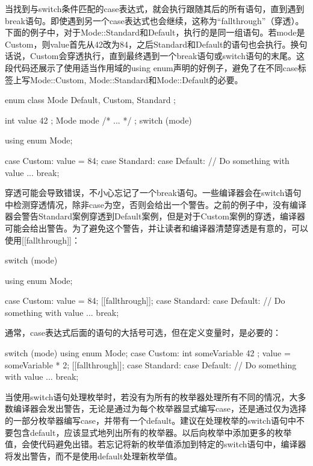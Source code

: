 当找到与switch条件匹配的case表达式，就会执行跟随其后的所有语句，直到遇到break语句。即使遇到另一个case表达式也会继续，这称为“fallthrough”（穿透）。下面的例子中，对于Mode::Standard和Default，执行的是同一组语句。若mode是Custom，则value首先从42改为84，之后Standard和Default的语句也会执行。换句话说，Custom会穿透执行，直到最终遇到一个break语句或switch语句的末尾。这段代码还展示了使用适当作用域的using enum声明的好例子，避免了在不同case标签上写Mode::Custom, Mode::Standard和Mode::Default的必要。

\begin{cpp}
enum class Mode { Default, Custom, Standard };

int value { 42 };
Mode mode { /* ... */ };
switch (mode) {
    using enum Mode;

    case Custom:
        value = 84;
    case Standard:
    case Default:
        // Do something with value ...
        break;
}
\end{cpp}

穿透可能会导致错误，不小心忘记了一个break语句。一些编译器会在switch语句中检测穿透情况，除非case为空，否则会给出一个警告。之前的例子中，没有编译器会警告Standard案例穿透到Default案例，但是对于Custom案例的穿透，编译器可能会给出警告。为了避免这个警告，并让读者和编译器清楚穿透是有意的，可以使用[[fallthrough]]：

\begin{cpp}
switch (mode) {
    using enum Mode;

    case Custom:
        value = 84;
        [[fallthrough]];
    case Standard:
    case Default:
        // Do something with value ...
        break;
}
\end{cpp}

通常，case表达式后面的语句的大括号可选，但在定义变量时，是必要的：

\begin{cpp}
switch (mode) {
    using enum Mode;
    case Custom:
        {
            int someVariable { 42 };
            value = someVariable * 2;
            [[fallthrough]];
        }
    case Standard:
    case Default:
        // Do something with value ...
        break;
}
\end{cpp}

当使用switch语句处理枚举时，若没有为所有的枚举器处理所有不同的情况，大多数编译器会发出警告，无论是通过为每个枚举器显式编写case，还是通过仅为选择的一部分枚举器编写case，并带有一个default。建议在处理枚举的switch语句中不要包含default，应该显式地列出所有的枚举器。以后向枚举中添加更多的枚举值，会使代码避免出错。若忘记将新的枚举值添加到特定的switch语句中，编译器将发出警告，而不是使用default处理新枚举值。

